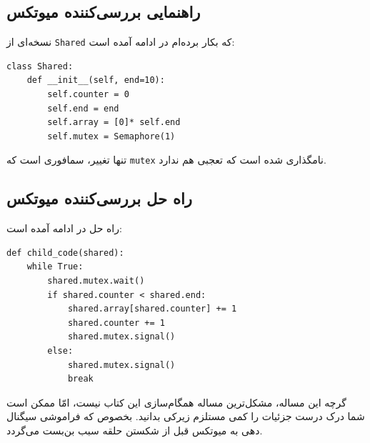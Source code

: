 \documentclass{book}
\newcommand{\clearemptydoublepage}{\newpage\cleardoublepage}
\begin{document}
\clearemptydoublepage
\subsection{راهنمایی بررسی‌کننده میوتکس}

    نسخه‌ای از  {\tt Shared} که بکار برده‌ام در ادامه آمده است: 
\begin{latin}
\begin{lstlisting}
class Shared:
    def __init__(self, end=10):
        self.counter = 0
        self.end = end
        self.array = [0]* self.end
        self.mutex = Semaphore(1)
\end{lstlisting}
\end{latin}

    تنها تغییر،  سمافوری است که {\tt mutex} نامگذاری شده است که تعجبی هم ندارد. 

\clearemptydoublepage
\subsection{راه حل بررسی‌کننده میوتکس}

    راه حل در ادامه آمده است:

\begin{latin}
\begin{lstlisting}
def child_code(shared):
    while True:
        shared.mutex.wait()
        if shared.counter < shared.end:
            shared.array[shared.counter] += 1
            shared.counter += 1
            shared.mutex.signal()
        else:
            shared.mutex.signal()
            break
\end{lstlisting}
\end{latin}

    گرچه این مساله، مشکل‌ترین مساله همگام‌سازی این کتاب نیست، امّا ممکن است شما درک درست جزئیات را کمی مستلزم زیرکی بدانید.
    بخصوص که فراموشی سیگنال دهی به میوتکس قبل از شکستن حلقه سبب بن‌بست می‌گردد. 
\end{document}
